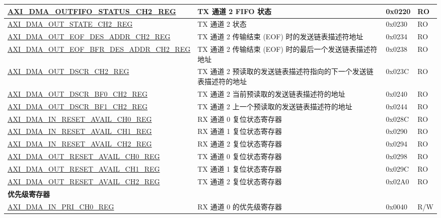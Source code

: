 \begin{longtable}{ | l | l | p{1.3cm} | l | }
\hyperref[regdesc:AXIDMAOUTFIFOSTATUSCHNREG]{AXI\_DMA\_OUTFIFO\_STATUS\_CH2\_REG} & TX 通道 2 FIFO 状态 & 0x0220 & RO \\ \hline
\hyperref[regdesc:AXIDMAOUTSTATECHNREG]{AXI\_DMA\_OUT\_STATE\_CH2\_REG} & TX 通道 2 状态 & 0x0230 & RO \\ \hline
\hyperref[regdesc:AXIDMAOUTEOFDESADDRCHNREG]{AXI\_DMA\_OUT\_EOF\_DES\_ADDR\_CH2\_REG} & TX 通道 2 传输结束 (EOF) 时的发送链表描述符地址 & 0x0234 & RO \\ \hline
\hyperref[regdesc:AXIDMAOUTEOFBFRDESADDRCHNREG]{AXI\_DMA\_OUT\_EOF\_BFR\_DES\_ADDR\_CH2\_REG} & TX 通道 2 传输结束 (EOF) 时的最后一个发送链表描述符地址 & 0x0238 & RO \\ \hline
\hyperref[regdesc:AXIDMAOUTDSCRCHNREG]{AXI\_DMA\_OUT\_DSCR\_CH2\_REG} & TX 通道 2 预读取的发送链表描述符指向的下一个发送链表描述符的地址 & 0x023C & RO \\ \hline
\hyperref[regdesc:AXIDMAOUTDSCRBF0CHNREG]{AXI\_DMA\_OUT\_DSCR\_BF0\_CH2\_REG} & TX 通道 2 当前预读取的发送链表描述符的地址 & 0x0240 & RO \\ \hline
\hyperref[regdesc:AXIDMAOUTDSCRBF1CHNREG]{AXI\_DMA\_OUT\_DSCR\_BF1\_CH2\_REG} & TX 通道 2 上一个预读取的发送链表描述符的地址 & 0x0244 & RO \\ \hline
\hyperref[regdesc:AXIDMAINRESETAVAILCHNREG]{AXI\_DMA\_IN\_RESET\_AVAIL\_CH0\_REG} & RX 通道 0 复位状态寄存器 & 0x028C & RO \\ \hline
\hyperref[regdesc:AXIDMAINRESETAVAILCHNREG]{AXI\_DMA\_IN\_RESET\_AVAIL\_CH1\_REG} & RX 通道 1 复位状态寄存器 & 0x0290 & RO \\ \hline
\hyperref[regdesc:AXIDMAINRESETAVAILCHNREG]{AXI\_DMA\_IN\_RESET\_AVAIL\_CH2\_REG} & RX 通道 2 复位状态寄存器 & 0x0294 & RO \\ \hline
\hyperref[regdesc:AXIDMAOUTRESETAVAILCHNREG]{AXI\_DMA\_OUT\_RESET\_AVAIL\_CH0\_REG} & TX 通道 0 复位状态寄存器 & 0x0298 & RO \\ \hline
\hyperref[regdesc:AXIDMAOUTRESETAVAILCHNREG]{AXI\_DMA\_OUT\_RESET\_AVAIL\_CH1\_REG} & TX 通道 1 复位状态寄存器 & 0x029C & RO \\ \hline
\hyperref[regdesc:AXIDMAOUTRESETAVAILCHNREG]{AXI\_DMA\_OUT\_RESET\_AVAIL\_CH2\_REG} & TX 通道 2 复位状态寄存器 & 0x02A0 & RO \\ \hline
\multicolumn{4}{|l|}{\textbf{优先级寄存器}} \\ \hline
\hyperref[regdesc:AXIDMAINPRICHNREG]{AXI\_DMA\_IN\_PRI\_CH0\_REG} & RX 通道 0 的优先级寄存器 & 0x0040 & R/W \\ \hline

\end{longtable}
